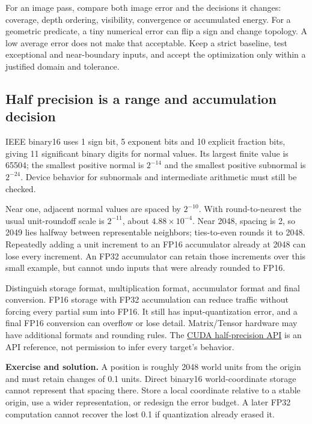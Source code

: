 For an image pass, compare both image error and the decisions it changes: coverage, depth ordering, visibility, convergence or accumulated energy. For a geometric predicate, a tiny numerical error can flip a sign and change topology. A low average error does not make that acceptable. Keep a strict baseline, test exceptional and near-boundary inputs, and accept the optimization only within a justified domain and tolerance.

\subsection{Half precision is a range and accumulation decision}\label{03-visual-computing-i-ch016-half-precision-is-a-range-and-accumulation-decision}

\hypertarget{03-visual-computing-i-ch016-half-precision-is-a-range-and-accumulation-decision}{}

IEEE binary16 uses 1 sign bit, 5 exponent bits and 10 explicit fraction bits, giving 11 significant binary digits for normal values. Its largest finite value is 65504; the smallest positive normal is \(2^{-14}\) and the smallest positive subnormal is \(2^{-24}\). Device behavior for subnormals and intermediate arithmetic must still be checked.

Near one, adjacent normal values are spaced by \(2^{-10}\). With round-to-nearest the usual unit-roundoff scale is \(2^{-11}\), about \(4.88\times10^{-4}\). Near 2048, spacing is 2, so 2049 lies halfway between representable neighbors; ties-to-even rounds it to 2048. Repeatedly adding a unit increment to an FP16 accumulator already at 2048 can lose every increment. An FP32 accumulator can retain those increments over this small example, but cannot undo inputs that were already rounded to FP16.

Distinguish storage format, multiplication format, accumulator format and final conversion. FP16 storage with FP32 accumulation can reduce traffic without forcing every partial sum into FP16. It still has input-quantization error, and a final FP16 conversion can overflow or lose detail. Matrix/Tensor hardware may have additional formats and rounding rules. The \href{https://docs.nvidia.com/cuda/cuda-math-api/cuda_math_api/group__CUDA__MATH__INTRINSIC__HALF.html}{CUDA half-precision API} is an API reference, not permission to infer every target's behavior.

\textbf{Exercise and solution.} A position is roughly 2048 world units from the origin and must retain changes of 0.1 units. Direct binary16 world-coordinate storage cannot represent that spacing there. Store a local coordinate relative to a stable origin, use a wider representation, or redesign the error budget. A later FP32 computation cannot recover the lost 0.1 if quantization already erased it.

